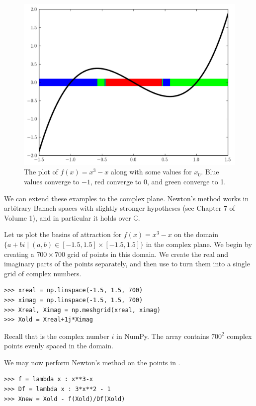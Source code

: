 \begin{figure}
    \centering
    \includegraphics[scale=0.5]{figures/fractal1d.pdf}
    \caption{The plot of $f(x) = x^3 -x$ along with some values for $x_0$.
    Blue values converge to $-1$, red converge to 0, and green converge to 1.}
    \label{fig:fractal_1d}
\end{figure}

We can extend these examples to the complex plane.
Newton's method works in arbitrary Banach spaces with slightly stronger hypotheses (see Chapter 7 of Volume 1), and in particular it holds over $\mathbb{C}$.

Let us plot the basins of attraction for $f(x) = x^3-x$ on the domain $\{a+bi \mid (a, b) \in [-1.5, 1.5] \times [-1.5, 1.5] \}$ in the complex plane.
We begin by creating a $700 \times 700$ grid of points in this domain.
We create the real and imaginary parts of the points separately, and then use  to turn them into a single grid of complex numbers.

\begin{lstlisting}
>>> xreal = np.linspace(-1.5, 1.5, 700)
>>> ximag = np.linspace(-1.5, 1.5, 700)
>>> Xreal, Ximag = np.meshgrid(xreal, ximag)
>>> Xold = Xreal+1j*Ximag
\end{lstlisting}

Recall that  is the complex number $i$ in NumPy.
The array  contains $700^2$ complex points evenly spaced in the domain.

We may now perform Newton's method on the points in .

\begin{lstlisting}
>>> f = lambda x : x**3-x
>>> Df = lambda x : 3*x**2 - 1
>>> Xnew = Xold - f(Xold)/Df(Xold)
\end{lstlisting}

